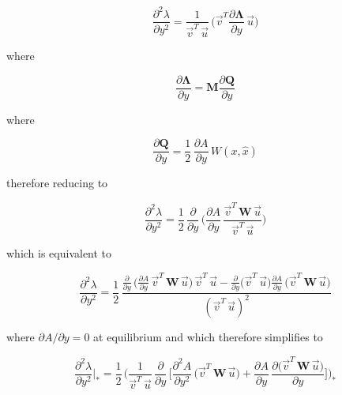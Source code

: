 \begin{equation}
    \frac{\partial^2 \lambda}{\partial y^2} = \frac{1}{\overrightarrow{v}^T\,\overrightarrow{u}}\,\bigg(\overrightarrow{v}^T\frac{\partial \pmb \Lambda}{\partial y}\,\overrightarrow{u}\bigg)
\end{equation}

where 

\begin{equation}
    \frac{\partial \pmb \Lambda}{\partial y} = \pmb M \frac{\partial \pmb Q}{\partial y}
\end{equation}

where

\begin{equation}
    \frac{\partial \pmb Q}{\partial y} = \frac{1}{2}\,\frac{\partial A}{\partial y}\,W(x,\hat x)
\end{equation}

therefore reducing to

\begin{equation}
    \frac{\partial^2 \lambda}{\partial y^2} = \frac{1}{2}\,\frac{\partial}{\partial y}\,\bigg(\frac{\partial A}{\partial y}\, \frac{\overrightarrow{v}^T\,\pmb W\,\overrightarrow{u}}{\overrightarrow{v}^T\,\overrightarrow{u}}\bigg)
\end{equation}

which is equivalent to

\begin{equation}
    \frac{\partial^2 \lambda}{\partial y^2} = \frac{1}{2}\,\frac{\frac{\partial}{\partial y}\,\Big(\frac{\partial A}{\partial y}\,\overrightarrow{v}^T\,\pmb W\,\overrightarrow{u}\Big)\,\overrightarrow{v}^T\,\overrightarrow{u}-\frac{\partial}{\partial y}\Big(\overrightarrow{v}^T\,\overrightarrow{u}\Big)\frac{\partial A}{\partial y}\,\Big(\overrightarrow{v}^T\,\pmb W\,\overrightarrow{u}\Big)}{(\overrightarrow{v}^T\,\overrightarrow{u})^2}
\end{equation}

where $\partial A / \partial y = 0$ at equilibrium and which therefore simplifies to

\begin{equation}
    \frac{\partial^2 \lambda}{\partial y^2}\bigg|_* = \frac{1}{2}\,\Bigg(\frac{1}{\overrightarrow{v}^T\,\overrightarrow{u}}\,\frac{\partial}{\partial y}\,\bigg[\frac{\partial^2 A}{\partial y^2}\,\Big(\overrightarrow{v}^T\,\pmb W\,\overrightarrow{u}\Big)+\frac{\partial A}{\partial y}\,\frac{\partial \big(\overrightarrow{v}^T\,\pmb W\,\overrightarrow{u}\big)}{\partial y}\bigg]\Bigg)_*
\end{equation}

